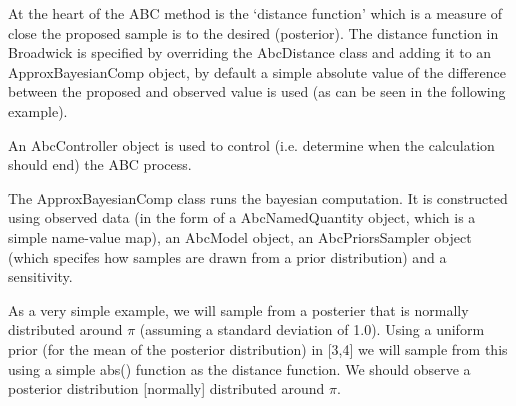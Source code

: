 At the heart of the ABC method is the `distance function'  which is a measure of close the proposed sample is to the desired (posterior). The distance function in Broadwick is specified by overriding the AbcDistance class and adding it to an ApproxBayesianComp object, by default a simple absolute value of the difference between the proposed and observed value is used (as can be seen in the following example).

An AbcController object is used to control (i.e. determine when the calculation should end) the ABC process.

The ApproxBayesianComp class runs the bayesian computation. It is constructed using observed data (in the form of a AbcNamedQuantity object, which is a simple name-value map), an AbcModel object, an AbcPriorsSampler object (which specifes how samples are drawn from a prior distribution) and a sensitivity.

As a very simple example, we will sample from a posterier that is normally distributed around $\pi$ (assuming a standard deviation of 1.0). Using a uniform prior (for the mean of the posterior distribution) in [3,4] we will sample from this using a simple abs() function as the distance function. We should observe a posterior distribution [normally] distributed around $\pi$.

